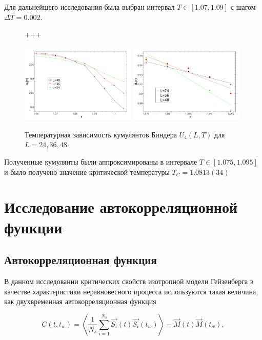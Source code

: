 \documentclass[a4paper,14pt]{extarticle}
\begin{document}
Для дальнейшего исследования была выбран интервал $T \in [1.07, 1.09]$ с шагом $\Delta T = 0.002$.
\begin{figure}[H]
	\begin{center}+++
		
		\includegraphics[width=0.49\textwidth]{kumsecond.pdf}
				\includegraphics[width=0.49\textwidth]{kumfirst.pdf}
		\caption{\label{testSolution} Температурная зависимость кумулянтов Биндера $U_4(L,T)$ для $L=24,36,48$.}
	\end{center}
\end{figure}

Полученные кумулянты были аппроксимированы в интервале $T \in [1.075, 1.095]$ и было получено значение критической температуры $T_C = 1.0813(34)$

\section{Исследование автокорреляционной функции}
\subsection{Автокорреляционная функция}
В данном исследовании критических свойств изотропной модели Гейзенберга в качестве характеристики неравновесного процесса
используются такая величина, как двухвременная автокорреляционная функция
 
 \begin{equation}
   {C}(t,t_w) = \left\langle \frac{1}{N_s} \sum_{i=1}^{N_s} \overrightarrow{S_i}(t) \overrightarrow{S_i}(t_w) \right\rangle - \overrightarrow{M}(t) \overrightarrow{M}(t_w),
\end{equation}
\end{document}
